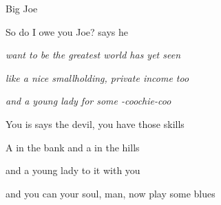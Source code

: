 \begin{SBSong}{Big Joe}
\begin{SBVerse}
	 So  do I owe you Joe?  says he
	
	 \emph{ want to be the greatest  world has yet seen}
	
	 \emph{ like a nice smallholding,  private income too}
	
	 \emph{and a  young lady for some -coochie-coo}
  \end{SBVerse}
  \begin{SBVerse}
    You  is says the devil, you  have those skills
	
	 A  in the bank and a  in the hills
	
	 and a  young lady to  it with you 
	
	and you can  your soul, man, now  play some blues
  \end{SBVerse}
 \end{SBSong}
 